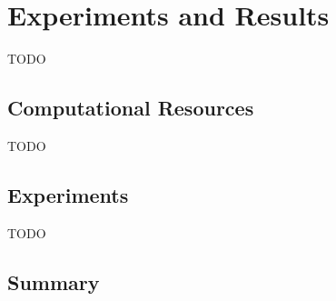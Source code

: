\documentclass[../chapters.tex]{subfiles}
\begin{document}
    \chapter{Experiments and Results}\label{sec:experiments-and-results}
    TODO


    \section{Computational Resources}\label{sec:computational-resources}
    TODO


    \section{Experiments}\label{sec:experiments}
    TODO


    \section{Summary}\label{sec:summary}
\end{document}

